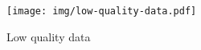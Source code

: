 \begin{figure}[ht]
    \centering
    \texttt{[image: img/low-quality-data.pdf]}
    \caption{Low quality data}
    \label{fig:low_quality_data}
\end{figure}